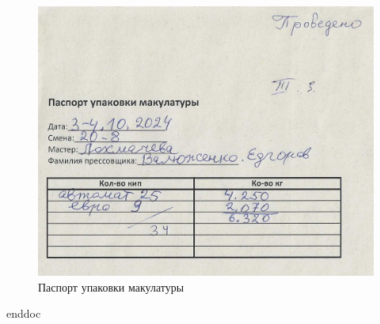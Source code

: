 \clearpage
\begin{figure}
\begin{center}
 \includegraphics[height=0.5\textheight, keepaspectratio]{Pics/III.3.jpg}
\end{center}
 \caption{Паспорт упаковки макулатуры}
 \label{pic:III.3}
\end{figure}



\clearpage
 {enddoc}